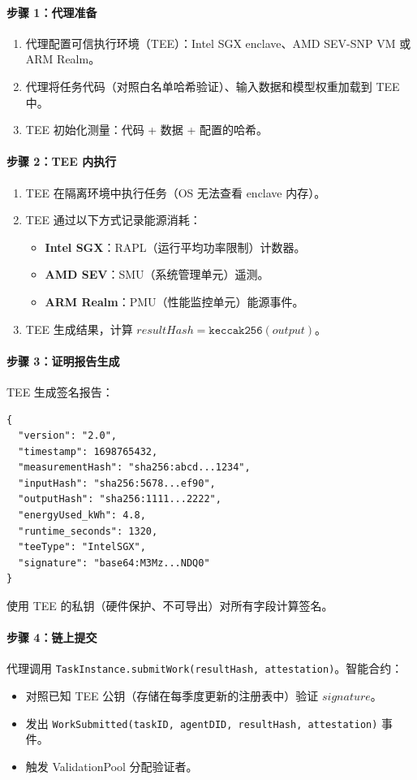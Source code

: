 \documentclass[11pt]{article}
\begin{document}
\paragraph{步骤 1：代理准备}
\begin{enumerate}[noitemsep]
  \item 代理配置可信执行环境（TEE）：Intel SGX enclave、AMD SEV-SNP VM 或 ARM Realm。
  \item 代理将任务代码（对照白名单哈希验证）、输入数据和模型权重加载到 TEE 中。
  \item TEE 初始化测量：代码 + 数据 + 配置的哈希。
\end{enumerate}

\paragraph{步骤 2：TEE 内执行}
\begin{enumerate}[noitemsep]
  \item TEE 在隔离环境中执行任务（OS 无法查看 enclave 内存）。
  \item TEE 通过以下方式记录能源消耗：
    \begin{itemize}[noitemsep]
      \item \textbf{Intel SGX}：RAPL（运行平均功率限制）计数器。
      \item \textbf{AMD SEV}：SMU（系统管理单元）遥测。
      \item \textbf{ARM Realm}：PMU（性能监控单元）能源事件。
    \end{itemize}
  \item TEE 生成结果，计算 $resultHash = \texttt{keccak256}(output)$。
\end{enumerate}

\paragraph{步骤 3：证明报告生成}
TEE 生成签名报告：
\begin{verbatim}
{
  "version": "2.0",
  "timestamp": 1698765432,
  "measurementHash": "sha256:abcd...1234",
  "inputHash": "sha256:5678...ef90",
  "outputHash": "sha256:1111...2222",
  "energyUsed_kWh": 4.8,
  "runtime_seconds": 1320,
  "teeType": "IntelSGX",
  "signature": "base64:M3Mz...NDQ0"
}
\end{verbatim}
使用 TEE 的私钥（硬件保护、不可导出）对所有字段计算签名。

\paragraph{步骤 4：链上提交}
代理调用 \texttt{TaskInstance.submitWork(resultHash, attestation)}。智能合约：
\begin{itemize}[noitemsep]
  \item 对照已知 TEE 公钥（存储在每季度更新的注册表中）验证 $signature$。
  \item 发出 \texttt{WorkSubmitted(taskID, agentDID, resultHash, attestation)} 事件。
  \item 触发 ValidationPool 分配验证者。
\end{itemize}
\end{document}
